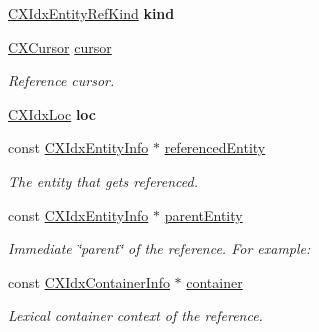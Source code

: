 \begin{DoxyCompactItemize}
\item 
\mbox{\label{structCXIdxEntityRefInfo_a2fe39009e3bf47bcc95ecaa638b88705}} 
\hyperlink{group__CINDEX__HIGH_ga4158d96205b540d3ef4992cf6689c2aa}{C\+X\+Idx\+Entity\+Ref\+Kind} {\bfseries kind}
\item 
\mbox{\label{structCXIdxEntityRefInfo_a4ab3eace1d62834dab9eb8dc2be61677}} 
\hyperlink{structCXCursor}{C\+X\+Cursor} \hyperlink{structCXIdxEntityRefInfo_a4ab3eace1d62834dab9eb8dc2be61677}{cursor}
\begin{DoxyCompactList}\small\item\em Reference cursor. \end{DoxyCompactList}\item 
\mbox{\label{structCXIdxEntityRefInfo_a7d94b4e276b5834756bedfd3918a1b03}} 
\hyperlink{structCXIdxLoc}{C\+X\+Idx\+Loc} {\bfseries loc}
\item 
\mbox{\label{structCXIdxEntityRefInfo_a5ce7e39d0504c0ee598cc7e0fc28f00d}} 
const \hyperlink{structCXIdxEntityInfo}{C\+X\+Idx\+Entity\+Info} $\ast$ \hyperlink{structCXIdxEntityRefInfo_a5ce7e39d0504c0ee598cc7e0fc28f00d}{referenced\+Entity}
\begin{DoxyCompactList}\small\item\em The entity that gets referenced. \end{DoxyCompactList}\item 
const \hyperlink{structCXIdxEntityInfo}{C\+X\+Idx\+Entity\+Info} $\ast$ \hyperlink{structCXIdxEntityRefInfo_aa01a3ce2b823d13984eed3ab0676a3b7}{parent\+Entity}
\begin{DoxyCompactList}\small\item\em Immediate \char`\"{}parent\char`\"{} of the reference. For example\+: \end{DoxyCompactList}\item 
\mbox{\label{structCXIdxEntityRefInfo_a52b5199fb32f1cf2bac41e2b40f9cc32}} 
const \hyperlink{structCXIdxContainerInfo}{C\+X\+Idx\+Container\+Info} $\ast$ \hyperlink{structCXIdxEntityRefInfo_a52b5199fb32f1cf2bac41e2b40f9cc32}{container}
\begin{DoxyCompactList}\small\item\em Lexical container context of the reference. \end{DoxyCompactList}\end{DoxyCompactItemize}


